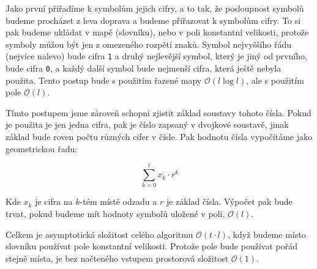 \documentclass{fkssolpub}
\author{Ondřej Sedláček}
\begin{document}
Jako první přiřadíme k symbolům jejich cifry, a to tak, že posloupnost symbolů
budeme procházet z leva doprava a budeme přiřazovat k symbolům cifry. To si pak
budeme ukládat v mapě (slovníku), nebo v poli konstantní velikosti, protože symboly
můžou být jen z omezeného rozpětí znaků. Symbol nejvyššího
řádu (nejvíce nalevo) bude cifra \verb|1| a druhý nejlevější symbol, který je
jiný od prvního, bude cifra \verb|0|, a každý další symbol bude nejmenší cifra,
která ještě nebyla použita. Tento
postup bude s použitím řazené mapy $\mathcal{O}(l \log l)$, ale s použitím
pole $\mathcal{O}(l)$.

Tímto postupem jsme zároveň schopni zjistit základ soustavy tohoto čísla.
Pokud je použita je jen jedna cifra, pak je číslo zapsaný v dvojkové soustavě,
jinak základ bude roven počtu různých cifer v čísle. Pak hodnotu
čísla vypočítáme jako geometrickou řadu:

\[
	\sum_{k=0}^{l} x_k \cdot r^k
\]

Kde $x_k$ je cifra na $k$-tém místě odzadu a $r$ je základ čísla. Výpočet pak
bude trvat, pokud budeme mít hodnoty symbolů uložené v poli, $\mathcal{O}(l)$.

Celkem je asymptotická složitost celého algoritmu $\mathcal{O}(t \cdot l)$, když
budeme místo slovníku používat pole konstantní velikosti. Protože pole bude
používat pořád stejně místa, je bez načteného vstupem prostorová složitost
$\mathcal{O}(1)$.
\end{document}
